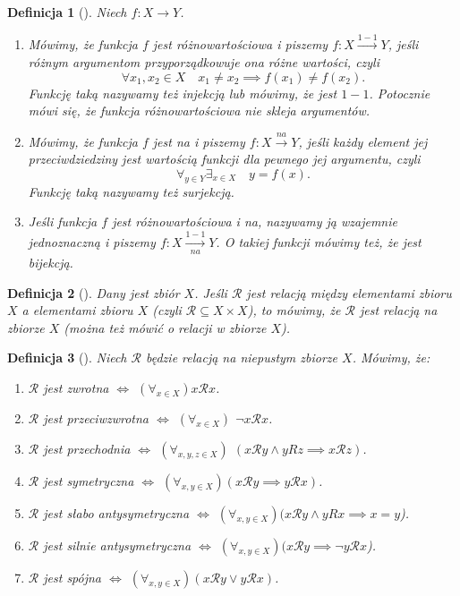 \documentclass[12pt,a4paper]{report}
\newtheorem{definition}{Definicja}[chapter]
\begin{document}
\begin{definition}[{\citep[Sec 5.2 Def. 5.5]{kraszewski2007wstkep}}]
Niech $f:X \to Y$.
\begin{enumerate}
\item
Mówimy, że funkcja $f$ jest różnowartościowa i piszemy $f:X\xrightarrow{1-1} Y$, jeśli różnym argumentom przyporządkowuje ona różne wartości, czyli
\begin{equation*}
\forall{x_{1},x_{2}}\in X \quad x_{1}\ne x_{2} \implies f(x_{1})\ne f(x_{2}).
\end{equation*}
Funkcję taką nazywamy też injekcją lub mówimy, że jest $1-1$. Potocznie mówi się, że funkcja różnowartościowa nie skleja argumentów.
\item
Mówimy, że funkcja $f$ jest na i piszemy $f:X\xrightarrow{na}Y$, jeśli każdy element jej przeciwdziedziny jest wartością funkcji dla pewnego jej argumentu, czyli
\begin{equation*}
\forall_{y\in Y} \exists_{x\in X} \quad y=f(x).
\end{equation*}
Funkcję taką nazywamy też surjekcją.
\item
Jeśli funkcja $f$ jest różnowartościowa i na, nazywamy ją wzajemnie jednoznaczną i piszemy $f:X\xrightarrow[na]{1-1} Y$. O takiej funkcji mówimy też, że jest bijekcją.
\end{enumerate}
\end{definition}

\begin{definition}[{\citep[Sec 6.1 Def. 6.2]{kraszewski2007wstkep}}]
Dany jest zbiór $X$. Jeśli $\mathcal{R}$ jest relacją między elementami zbioru $X$ a elementami zbioru $X$ (czyli $\mathcal{R}\subseteq X \times X$), to mówimy, że $\mathcal{R}$ jest relacją na zbiorze $X$ (można też mówić o relacji w zbiorze $X$).
\end{definition}


\begin{definition}[{\citep[Sec 6.2 Def. 6.6]{kraszewski2007wstkep}}]
Niech $\mathcal{R}$ będzie relacją na niepustym zbiorze $X$. Mówimy, że:
\begin{enumerate}
\item
$\mathcal{R}$ jest zwrotna $\iff$ $(\forall_{x\in X}) x\mathcal{R}x$.
\item
$\mathcal{R}$ jest przeciwzwrotna $\iff$ $(\forall_{x\in X})$ $\neg x\mathcal{R}x$.
\item
$\mathcal{R}$ jest przechodnia $\iff$ $(\forall_{x,y,z\in X})$ $(x\mathcal{R}y\land yRz  \implies x\mathcal{R}z)$.
\item
$\mathcal{R}$ jest symetryczna $\iff$ $(\forall_{x,y\in X})(x\mathcal{R}y \implies y\mathcal{R}x)$. 
\item
$\mathcal{R}$ jest słabo antysymetryczna $\iff$ $(\forall_{x,y\in X})( x\mathcal{R}y \land yRx \implies x=y$).
\item
$\mathcal{R}$ jest silnie antysymetryczna $\iff$ $(\forall_{x,y\in X})(x\mathcal{R}y \implies \neg y\mathcal{R}x$).
\item
$\mathcal{R}$ jest spójna $\iff$ $(\forall_{x,y\in X})(x\mathcal{R}y \lor y\mathcal{R}x)$.

\end{enumerate}
\end{definition}
\end{document}
